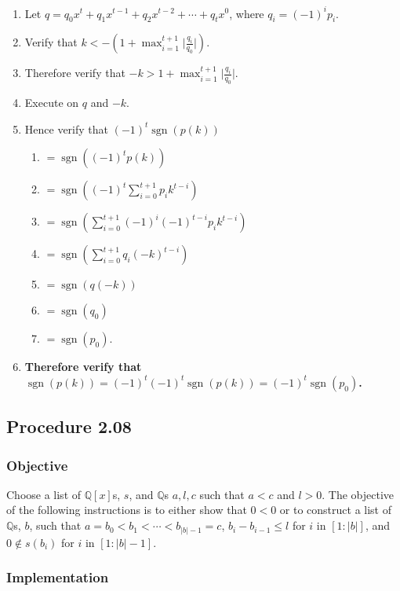 \documentclass[twocolumn]{article}
\DeclareMathOperator{\sgn}{sgn}
\newcommand{\procedure}[2][]{\subsection*{Procedure #2 \ifthenelse{\equal{#1}{}}{}{(#1)}}\label{sec:procedure #2}}
\newcommand{\objective}{\subsubsection*{Objective}}
\newcommand{\implementation}{\subsubsection*{Implementation}}
\newcommand{\procedurehr}[2][]{\hyperref[sec:procedure #2]{\ifthenelse{\equal{#1}{}}{procedure #2}{#1}}}
\begin{document}
				\begin{enumerate}
					\item Let $q=q_0x^t+q_1x^{t-1}+q_2x^{t-2}+\cdots+q_tx^0$, where $q_i=(-1)^ip_i$.
					\item Verify that $k<-(1+\max_{i=1}^{t+1}\lvert\frac{q_i}{q_0}\rvert)$.
					\item Therefore verify that $-k>1+\max_{i=1}^{t+1}\lvert\frac{q_i}{q_0}\rvert$.
					\item Execute \procedurehr{2.06} on $q$ and $-k$.
					\item Hence verify that $(-1)^t\sgn(p(k))$
					\begin{enumerate}
						\item $=\sgn((-1)^tp(k))$
						\item $=\sgn((-1)^t\sum_{i=0}^{t+1} p_ik^{t-i})$
						\item $=\sgn(\sum_{i=0}^{t+1} (-1)^i(-1)^{t-i}p_ik^{t-i})$
						\item $=\sgn(\sum_{i=0}^{t+1} q_i(-k)^{t-i})$
						\item $=\sgn(q(-k))$
						\item $=\sgn(q_0)$
						\item $=\sgn(p_0)$.
					\end{enumerate}
					\item \textbf{Therefore verify that $\sgn(p(k))=(-1)^t(-1)^t\sgn(p(k))=(-1)^t\sgn(p_0)$.}
				\end{enumerate}
		\procedure{2.08}
			\objective
				Choose a list of $\mathbb{Q}[x]$s, $s$, and $\mathbb{Q}$s $a,l,c$ such that $a<c$ and $l>0$. The objective of the following instructions is to either show that $0<0$ or to construct a list of $\mathbb{Q}$s, $b$, such that $a=b_0<b_1<\cdots<b_{\lvert b\rvert-1}=c$, $b_{i}-b_{i-1}\le l$ for $i$ in $[1:\lvert b\rvert]$, and $0\not\in s(b_i)$ for $i$ in $[1:\lvert b\rvert-1]$.
			\implementation
\end{document}
